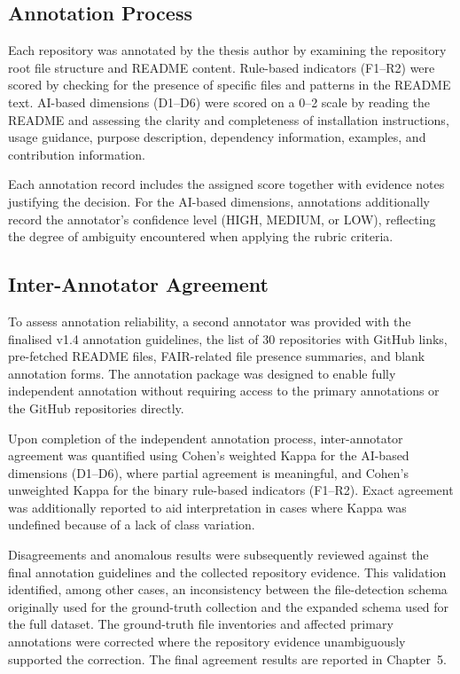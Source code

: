 \subsection{Annotation Process}

Each repository was annotated by the thesis author by examining 
the repository root file structure and README content. Rule-based 
indicators (F1--R2) were scored by checking for the presence of 
specific files and patterns in the README text. AI-based dimensions 
(D1--D6) were scored on a 0--2 scale by reading the README and 
assessing the clarity and completeness of installation instructions, 
usage guidance, purpose description, dependency information, 
examples, and contribution information.

Each annotation record includes the assigned score together with 
evidence notes justifying the decision. For the AI-based dimensions, 
annotations additionally record the annotator's confidence level 
(HIGH, MEDIUM, or LOW), reflecting the degree of ambiguity 
encountered when applying the rubric criteria.

\subsection{Inter-Annotator Agreement}

To assess annotation reliability, a second annotator was provided 
with the finalised v1.4 annotation guidelines, the list of 30 
repositories with GitHub links, pre-fetched README files, 
FAIR-related file presence summaries, and blank annotation forms. 
The annotation package was designed to enable fully independent 
annotation without requiring access to the primary annotations or 
the GitHub repositories directly.

Upon completion of the independent annotation process,
inter-annotator agreement was quantified using Cohen's weighted
Kappa for the AI-based dimensions (D1--D6), where partial agreement
is meaningful, and Cohen's unweighted Kappa for the binary
rule-based indicators (F1--R2). Exact agreement was additionally
reported to aid interpretation in cases where Kappa was undefined
because of a lack of class variation.

Disagreements and anomalous results were subsequently reviewed
against the final annotation guidelines and the collected repository
evidence. This validation identified, among other cases, an
inconsistency between the file-detection schema originally used for
the ground-truth collection and the expanded schema used for the
full dataset. The ground-truth file inventories and affected primary
annotations were corrected where the repository evidence
unambiguously supported the correction. The final agreement results
are reported in Chapter~5.

